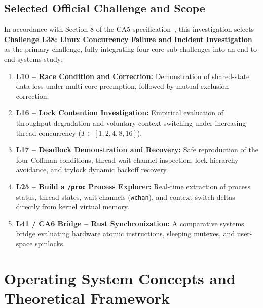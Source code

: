 \documentclass[11pt,a4paper]{article}
\begin{document}
\subsection{Selected Official Challenge and Scope}
In accordance with Section 8 of the CA5 specification~\cite{ca5_spec}, this investigation selects \textbf{Challenge L38: Linux Concurrency Failure and Incident Investigation} as the primary challenge, fully integrating four core sub-challenges into an end-to-end systems study:
\begin{enumerate}
    \item \textbf{L10 -- Race Condition and Correction:} Demonstration of shared-state data loss under multi-core preemption, followed by mutual exclusion correction.
    \item \textbf{L16 -- Lock Contention Investigation:} Empirical evaluation of throughput degradation and voluntary context switching under increasing thread concurrency ($T \in [1, 2, 4, 8, 16]$).
    \item \textbf{L17 -- Deadlock Demonstration and Recovery:} Safe reproduction of the four Coffman conditions, thread wait channel inspection, lock hierarchy avoidance, and trylock dynamic backoff recovery.
    \item \textbf{L25 -- Build a \texttt{/proc} Process Explorer:} Real-time extraction of process status, thread states, wait channels (\texttt{wchan}), and context-switch deltas directly from kernel virtual memory.
    \item \textbf{L41 / CA6 Bridge -- Rust Synchronization:} A comparative systems bridge evaluating hardware atomic instructions, sleeping mutexes, and user-space spinlocks.
\end{enumerate}

\section{Operating System Concepts and Theoretical Framework}
\end{document}
